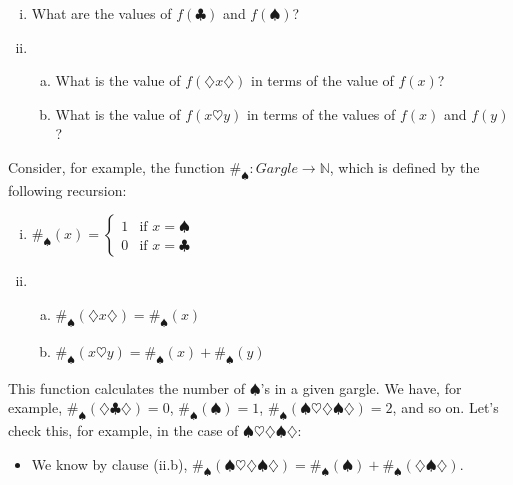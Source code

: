 \begin{enumerate}[{\thesection}.1]
\begin{enumerate}[(i)]
			\item What are the values of $ f(\clubsuit)$ and $f(\spadesuit)$?
			
			\item \begin{enumerate}[(a)]
					
					\item  What is the value of $f(\diamondsuit x\diamondsuit)$ in terms of the value of $f(x)$?

					\item What is the value of $f(x\heartsuit y)$ in terms of the values of $f(x)$ and $f(y)$?
					
		\end{enumerate}
		
		\end{enumerate}
		
	Consider, for example, the function $\#_\spadesuit:Gargle\to\mathbb{N}$, which is defined by the following recursion:
		
	\begin{enumerate}[(i)]
		
			\item $\#_\spadesuit(x)=\begin{cases} 1 & \text{if }x=\spadesuit
			\\0 &\text{if }x=\clubsuit\end{cases}$
			
			\item \begin{enumerate}[(a)]
					
					\item  $\#_\spadesuit( \diamondsuit x\diamondsuit)=\#_\spadesuit(x)$

					\item $\#_\spadesuit(x\heartsuit y)=\#_\spadesuit(x)+\#_\spadesuit(y)$		
		\end{enumerate}
		
		\end{enumerate}
		This function calculates the number of $\spadesuit$'s in a given gargle. We have, for example, $\#_\spadesuit(\diamondsuit\clubsuit\diamondsuit)=0$, $\#_\spadesuit(\spadesuit)=1$, $\#_\spadesuit(\spadesuit\heartsuit\diamondsuit\spadesuit\diamondsuit)=2$, and so on. Let's check this, for example, in the case of $\spadesuit\heartsuit\diamondsuit\spadesuit\diamondsuit$:
		
		\begin{itemize}
		
			\item We know by clause (ii.b), $\#_\spadesuit(\spadesuit\heartsuit\diamondsuit\spadesuit\diamondsuit)=\#_\spadesuit(\spadesuit)+\#_\spadesuit(\diamondsuit\spadesuit\diamondsuit)$.
			

\end{itemize}
\end{enumerate}
